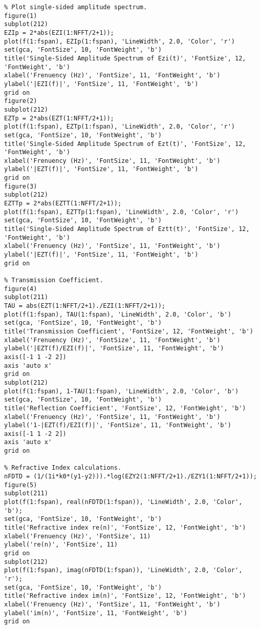 \begin{lstlisting}
% Plot single-sided amplitude spectrum.
figure(1)
subplot(212)
EZIp = 2*abs(EZI(1:NFFT/2+1));
plot(f(1:fspan), EZIp(1:fspan), 'LineWidth', 2.0, 'Color', 'r')
set(gca, 'FontSize', 10, 'FontWeight', 'b')
title('Single-Sided Amplitude Spectrum of Ezi(t)', 'FontSize', 12, 'FontWeight', 'b')
xlabel('Frenuency (Hz)', 'FontSize', 11, 'FontWeight', 'b')
ylabel('|EZI(f)|', 'FontSize', 11, 'FontWeight', 'b')
grid on
figure(2)
subplot(212)
EZTp = 2*abs(EZT(1:NFFT/2+1));
plot(f(1:fspan), EZTp(1:fspan), 'LineWidth', 2.0, 'Color', 'r')
set(gca, 'FontSize', 10, 'FontWeight', 'b')
title('Single-Sided Amplitude Spectrum of Ezt(t)', 'FontSize', 12, 'FontWeight', 'b')
xlabel('Frenuency (Hz)', 'FontSize', 11, 'FontWeight', 'b')
ylabel('|EZT(f)|', 'FontSize', 11, 'FontWeight', 'b')
grid on
figure(3)
subplot(212)
EZTTp = 2*abs(EZTT(1:NFFT/2+1));
plot(f(1:fspan), EZTTp(1:fspan), 'LineWidth', 2.0, 'Color', 'r')
set(gca, 'FontSize', 10, 'FontWeight', 'b')
title('Single-Sided Amplitude Spectrum of Eztt(t)', 'FontSize', 12, 'FontWeight', 'b')
xlabel('Frenuency (Hz)', 'FontSize', 11, 'FontWeight', 'b')
ylabel('|EZT(f)|', 'FontSize', 11, 'FontWeight', 'b')
grid on

% Transmission Coefficient.
figure(4)
subplot(211)
TAU = abs(EZT(1:NFFT/2+1)./EZI(1:NFFT/2+1));
plot(f(1:fspan), TAU(1:fspan), 'LineWidth', 2.0, 'Color', 'b')
set(gca, 'FontSize', 10, 'FontWeight', 'b')
title('Transmission Coefficient', 'FontSize', 12, 'FontWeight', 'b')
xlabel('Frenuency (Hz)', 'FontSize', 11, 'FontWeight', 'b')
ylabel('|EZT(f)/EZI(f)|', 'FontSize', 11, 'FontWeight', 'b')
axis([-1 1 -2 2])
axis 'auto x'
grid on
subplot(212)
plot(f(1:fspan), 1-TAU(1:fspan), 'LineWidth', 2.0, 'Color', 'b')
set(gca, 'FontSize', 10, 'FontWeight', 'b')
title('Reflection Coefficient', 'FontSize', 12, 'FontWeight', 'b')
xlabel('Frenuency (Hz)', 'FontSize', 11, 'FontWeight', 'b')
ylabel('1-|EZT(f)/EZI(f)|', 'FontSize', 11, 'FontWeight', 'b')
axis([-1 1 -2 2])
axis 'auto x'
grid on

% Refractive Index calculations.
nFDTD = (1/(1i*k0*(y1-y2))).*log(EZY2(1:NFFT/2+1)./EZY1(1:NFFT/2+1));
figure(5)
subplot(211)
plot(f(1:fspan), real(nFDTD(1:fspan)), 'LineWidth', 2.0, 'Color', 'b');
set(gca, 'FontSize', 10, 'FontWeight', 'b')
title('Refractive index re(n)', 'FontSize', 12, 'FontWeight', 'b')
xlabel('Frenuency (Hz)', 'FontSize', 11)
ylabel('re(n)', 'FontSize', 11)
grid on
subplot(212)
plot(f(1:fspan), imag(nFDTD(1:fspan)), 'LineWidth', 2.0, 'Color', 'r');
set(gca, 'FontSize', 10, 'FontWeight', 'b')
title('Refractive index im(n)', 'FontSize', 12, 'FontWeight', 'b')
xlabel('Frenuency (Hz)', 'FontSize', 11, 'FontWeight', 'b')
ylabel('im(n)', 'FontSize', 11, 'FontWeight', 'b')
grid on
\end{lstlisting}
